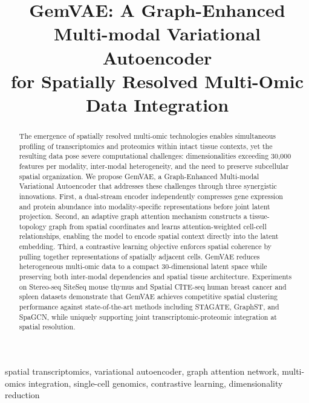 \documentclass[conference]{IEEEtran}
\begin{document}
\title{GemVAE: A Graph-Enhanced Multi-modal Variational Autoencoder\\
for Spatially Resolved Multi-Omic Data Integration}

\author{
}

\maketitle

\begin{abstract}
The emergence of spatially resolved multi-omic technologies enables simultaneous profiling of transcriptomics and proteomics within intact tissue contexts, yet the resulting data pose severe computational challenges: dimensionalities exceeding 30,000 features per modality, inter-modal heterogeneity, and the need to preserve subcellular spatial organization. We propose GemVAE, a Graph-Enhanced Multi-modal Variational Autoencoder that addresses these challenges through three synergistic innovations. First, a dual-stream encoder independently compresses gene expression and protein abundance into modality-specific representations before joint latent projection. Second, an adaptive graph attention mechanism constructs a tissue-topology graph from spatial coordinates and learns attention-weighted cell-cell relationships, enabling the model to encode spatial context directly into the latent embedding. Third, a contrastive learning objective enforces spatial coherence by pulling together representations of spatially adjacent cells. GemVAE reduces heterogeneous multi-omic data to a compact 30-dimensional latent space while preserving both inter-modal dependencies and spatial tissue architecture. Experiments on Stereo-seq SiteSeq mouse thymus and Spatial CITE-seq human breast cancer and spleen datasets demonstrate that GemVAE achieves competitive spatial clustering performance against state-of-the-art methods including STAGATE, GraphST, and SpaGCN, while uniquely supporting joint transcriptomic-proteomic integration at spatial resolution.
\end{abstract}

\begin{IEEEkeywords}
spatial transcriptomics, variational autoencoder, graph attention network, multi-omics integration, single-cell genomics, contrastive learning, dimensionality reduction
\end{IEEEkeywords}
\end{document}
